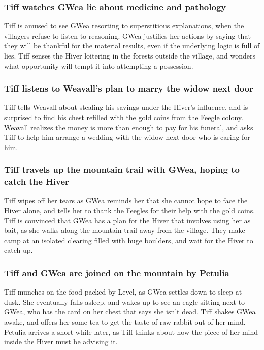 \subsubsection{\Gls{Tiff} watches \Gls{GWea} lie about medicine and pathology}
\Gls{Tiff} is amused to see \Gls{GWea} resorting to superstitious explanations, when the villagers
refuse to listen to reasoning. \Gls{GWea} justifies her actions by saying that they will be thankful
for the material results, even if the underlying logic is full of lies. \Gls{Tiff} senses the
\Gls{Hiver} loitering in the forests outside the village, and wonders what opportunity will tempt
it into attempting a possession.

\subsubsection{\Gls{Tiff} listens to \Gls{Weavall}'s plan to marry the widow next door}
\Gls{Tiff} tells \Gls{Weavall} about stealing his savings under the \Gls{Hiver}'s influence, and is
surprised to find his chest refilled with the gold coins from the Feegle colony. \Gls{Weavall}
realizes the money is more than enough to pay for his funeral, and asks \Gls{Tiff} to help him
arrange a wedding with the widow next door who is caring for him.

\subsubsection{\Gls{Tiff} travels up the mountain trail with \Gls{GWea}, hoping to catch the
    \Gls{Hiver}}
\Gls{Tiff} wipes off her tears as \Gls{GWea} reminds her that she cannot hope to face the
\Gls{Hiver} alone, and tells her to thank the Feegles for their help with the gold coins. \Gls{Tiff}
is convinced that \Gls{GWea} has a plan for the \Gls{Hiver} that involves using her as bait, as she
walks along the mountain trail away from the village. They make camp at an isolated clearing filled
with huge boulders, and wait for the \Gls{Hiver} to catch up.

\subsubsection{\Gls{Tiff} and \Gls{GWea} are joined on the mountain by \Gls{Petulia}}
\Gls{Tiff} munches on the food packed by \Gls{Level}, as \Gls{GWea} settles down to sleep at dusk.
She eventually falls asleep, and wakes up to see an eagle sitting next to \Gls{GWea}, who has the
card on her chest that says she isn't dead. \Gls{Tiff} shakes \Gls{GWea} awake, and offers her some
tea to get the taste of raw rabbit out of her mind. \Gls{Petulia} arrives a short while later, as
\Gls{Tiff} thinks about how the piece of her mind inside the \Gls{Hiver} must be advising it.

